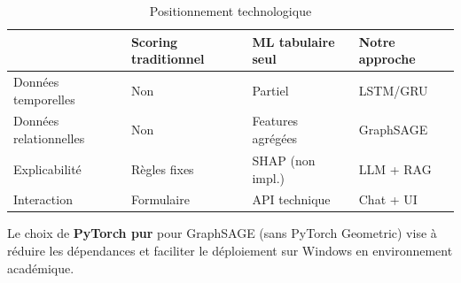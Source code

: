 \begin{table}[H]
  \centering
  \caption{Positionnement technologique}
  \begin{tabular}{|l|p{4cm}|p{4cm}|p{4cm}|}
    \hline
    & \textbf{Scoring traditionnel} & \textbf{ML tabulaire seul} & \textbf{Notre approche} \\
    \hline
    Données temporelles & Non & Partiel & LSTM/GRU \\
    \hline
    Données relationnelles & Non & Features agrégées & GraphSAGE \\
    \hline
    Explicabilité & Règles fixes & SHAP (non impl.) & LLM + RAG \\
    \hline
    Interaction & Formulaire & API technique & Chat + UI \\
    \hline
  \end{tabular}
\end{table}

Le choix de \textbf{PyTorch pur} pour GraphSAGE (sans PyTorch Geometric) vise à réduire les dépendances et faciliter le déploiement sur Windows en environnement académique.
